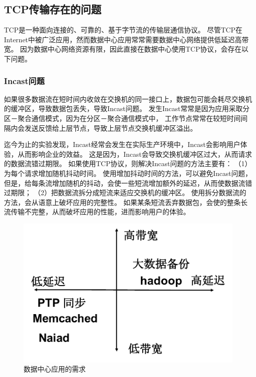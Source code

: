 \subsection{TCP传输存在的问题}
TCP是一种面向连接的、可靠的、基于字节流的传输层通信协议。
尽管TCP在Internet中被广泛应用，然而数据中心应用常常需要数据中心网络提供低延迟高带宽。
因为数据中心网络资源有限，因此直接在数据中心使用TCP协议，会存在以下问题。

\subsubsection{Incast问题}
如果很多数据流在短时间内收敛在交换机的同一接口上，数据包可能会耗尽交换机的缓冲区，导致数据包丢失，导致Incast问题\cite{Vasudevan2009Safe}。
发生Incast常常是因为应用采取分区－聚合通信模式，因为在分区－聚合通信模式中，
工作节点常常在较短时间间隔内会发送反馈给上层节点，导致上层节点交换机缓冲区溢出。

迄今为止的实验发现，Incast经常会发生在实际生产环境中，Incast会影响用户体验，从而影响企业的效益。
这是因为，Incast会导致交换机缓冲区过大，从而请求的数据流错过期限。
如果使用TCP协议，则解决Incast问题的方法主要有：
（1）为每个请求增加随机抖动时间。
使用增加抖动时间的方法，可以避免Incast问题，
但是，给每条流增加随机的抖动，会使一些短流增加额外的延迟，从而使数据流错过期限；
（2）把数据流拆分成短流来适应交换机的缓冲区。
使用拆分数据流的方法，会从语意上破坏应用的完整性。
如果某条短流丢弃数据包，会使的整条长流传输不完整，从而破坏应用的性能，进而影响用户的体验。
\begin{figure}[b]
\begin{center}
\includegraphics [width=0.9\columnwidth] {figures/others/require.pdf}
\caption{数据中心应用的需求}
\label{relatedwork-require-fig}
\end{center}
\end{figure}
